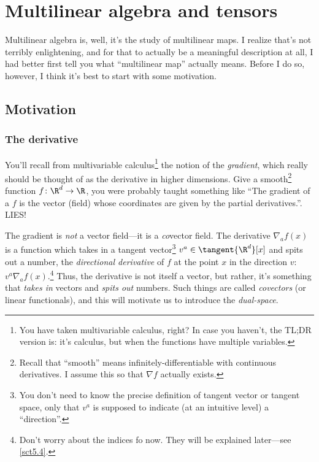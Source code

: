 \chapter{Multilinear algebra and tensors}

Multilinear algebra is, well, it's the study of multilinear maps.  I realize that's not terribly enlightening, and for that to actually be a meaningful description at all, I had better first tell you what ``multilinear map'' actually means.  Before I do so, however, I think it's best to start with some motivation.

\section{Motivation}

\subsection{The derivative}

You'll recall from multivariable calculus\footnote{You have taken multivariable calculus, right?  In case you haven't, the TL;DR version is:  it's calculus, but when the functions have multiple variables.} the notion of the \emph{gradient}, which really should be thought of as the derivative in higher dimensions.  Give a smooth\footnote{Recall that ``smooth'' means infinitely-differentiable with continuous derivatives.  I assume this so that $\nabla f$ actually exists.} function $f\colon \R ^d\rightarrow \R$, you were probably taught something like ``The gradient of a $f$ is the vector (field) whose coordinates are given by the partial derivatives.''.  LIES!

The gradient is \emph{not} a vector field---it is a \emph{co}vector field.  The derivative $\nabla _af(x)$ is a function which takes in a tangent vector\footnote{You don't need to know the precise definition of tangent vector or tangent space, only that $v^a$ is supposed to indicate (at an intuitive level) a ``direction''.} $v^a\in \tangent{\R ^d}[x]$ and spits out a number, the \emph{directional derivative} of $f$ at the point $x$ in the direction $v$:  $v^a\nabla _af(x)$.\footnote{Don't worry about the indices fo now.  They will be explained later---see \cref{sct5.4}.}  Thus, the derivative is not itself a vector, but rather, it's something that \emph{takes in} vectors and \emph{spits out} numbers.  Such things are called \emph{covectors} (or linear functionals), and this will motivate us to introduce the \emph{dual-space}.

